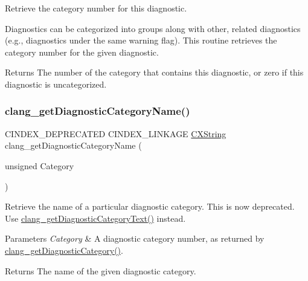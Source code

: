 Retrieve the category number for this diagnostic. 

Diagnostics can be categorized into groups along with other, related diagnostics (e.\+g., diagnostics under the same warning flag). This routine retrieves the category number for the given diagnostic.

\begin{DoxyReturn}{Returns}
The number of the category that contains this diagnostic, or zero if this diagnostic is uncategorized. 
\end{DoxyReturn}
\mbox{\label{group__CINDEX__DIAG_gaf3d608c7860a57ce6571a3b03b4ead33}} 
\subsubsection{\texorpdfstring{clang\+\_\+get\+Diagnostic\+Category\+Name()}{clang\_getDiagnosticCategoryName()}}
{\footnotesize\ttfamily C\+I\+N\+D\+E\+X\+\_\+\+D\+E\+P\+R\+E\+C\+A\+T\+ED C\+I\+N\+D\+E\+X\+\_\+\+L\+I\+N\+K\+A\+GE \hyperlink{structCXString}{C\+X\+String} clang\+\_\+get\+Diagnostic\+Category\+Name (\begin{DoxyParamCaption}\item[{unsigned}]{Category }\end{DoxyParamCaption})}



Retrieve the name of a particular diagnostic category. This is now deprecated. Use \hyperlink{group__CINDEX__DIAG_ga6950702b6122f1cd74e1a369605a9f54}{clang\+\_\+get\+Diagnostic\+Category\+Text()} instead. 


\begin{DoxyParams}{Parameters}
{\em Category} & A diagnostic category number, as returned by {\ttfamily \hyperlink{group__CINDEX__DIAG_ga0ec085bd59b8b6c935eab0e53a1f348f}{clang\+\_\+get\+Diagnostic\+Category()}}.\\
\hline
\end{DoxyParams}
\begin{DoxyReturn}{Returns}
The name of the given diagnostic category. 
\end{DoxyReturn}
\mbox{\label{group__CINDEX__DIAG_ga6950702b6122f1cd74e1a369605a9f54}} 
